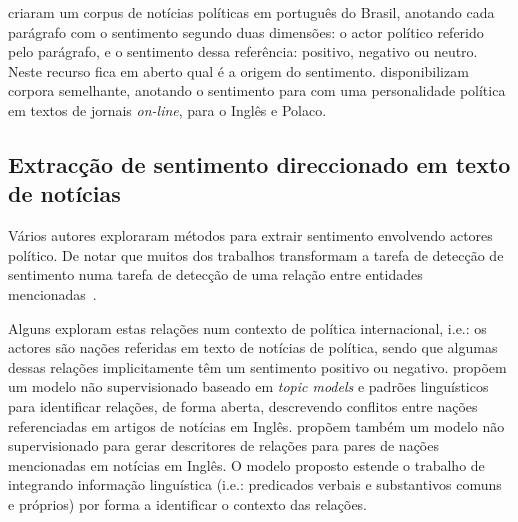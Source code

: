 \documentclass[a4paper, twocolumn, 11pt, twoside]{article}
\begin{document}
\cite{de-arruda-etal-2015-annotated} criaram um corpus de notícias políticas em português do Brasil, anotando cada parágrafo com o sentimento segundo duas dimensões: o actor político referido pelo parágrafo, e o sentimento dessa referência: positivo, negativo ou neutro. Neste recurso fica em aberto qual é a origem do sentimento. \cite{BARANIAK20213627} disponibilizam corpora semelhante, anotando o sentimento para com uma personalidade política em textos de jornais \textit{on-line}, para o Inglês e Polaco.

\subsection{Extracção de sentimento direccionado em texto de notícias}

Vários autores exploraram métodos para extrair sentimento envolvendo actores político. De notar que muitos dos trabalhos transformam a tarefa de detecção de sentimento numa tarefa de detecção de uma relação entre entidades mencionadas~\citep{bassignana-plank-2022-mean}.

Alguns exploram estas relações num contexto de política internacional, i.e.: os actores são nações referidas em texto de notícias de política, sendo que algumas dessas relações implicitamente têm um sentimento positivo ou negativo. \cite{oconnor-etal-2013-learning} propõem um modelo não supervisionado baseado em \textit{topic models} e padrões linguísticos para identificar relações, de forma aberta, descrevendo conflitos entre nações referenciadas em artigos de notícias em Inglês. \cite{han-etal-2019-permanent} propõem também um modelo não supervisionado para gerar descritores de relações para pares de nações mencionadas em notícias em Inglês.
O modelo proposto estende o trabalho de \cite{iyyer-etal-2016-feuding} integrando informação linguística (i.e.: predicados verbais e substantivos comuns e próprios) por forma a identificar o contexto das relações.
\end{document}
